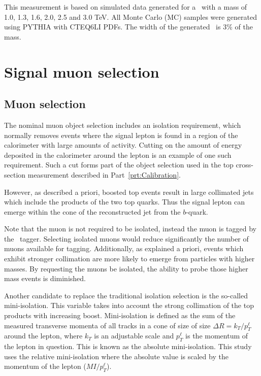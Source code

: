 This measurement is based on simulated data generated for a \Zprime\ with a mass of 1.0, 1.3, 1.6, 2.0, 2.5 and 3.0 TeV. All Monte Carlo (MC) samples were generated using \textsc{PYTHIA} with CTEQ6LI PDFs. The width of the generated \Zprime\ is $3\%$ of the mass. 

\section{Signal muon selection}

\subsection{Muon selection}
The nominal muon object selection includes an isolation requirement, which normally removes events where the signal lepton is found in a region of the calorimeter with large amounts of activity. Cutting on the amount of energy deposited in the calorimeter around the lepton is an example of one such requirement. Such a cut forms part of the object selection used in the top cross-section measurement described in Part~\ref{prt:Calibration}.

However, as described a priori, boosted top events result in large collimated jets which include the products of the two top quarks. Thus the signal lepton can emerge within the cone of the reconstructed jet from the $b$-quark. 

Note that the muon is not required to be isolated, instead the muon is tagged by the \xsm\ tagger. Selecting isolated muons would reduce significantly the number of muons available for tagging. Additionally, as explained a priori, events which exhibit stronger collimation are more likely to emerge from particles with higher masses. By requesting the muons be isolated, the ability to probe those higher mass events is diminished.

Another candidate to replace the traditional isolation selection is the so-called mini-isolation. This variable takes into account the strong collimation of the top products with increasing boost. Mini-isolation is defined as the sum of the measured transverse momenta of all tracks in a cone of size of size $\Delta R=k_{T}/p_{T}^{\ell}$ around the lepton, where $k_T$ is an adjustable scale and $p_{T}^{\ell}$ is the momentum of the lepton in question. This is known as the absolute mini-isolation. This study uses the relative mini-isolation where the absolute value is scaled by the momentum of the lepton ($MI/p_{T}^{\ell}$).

